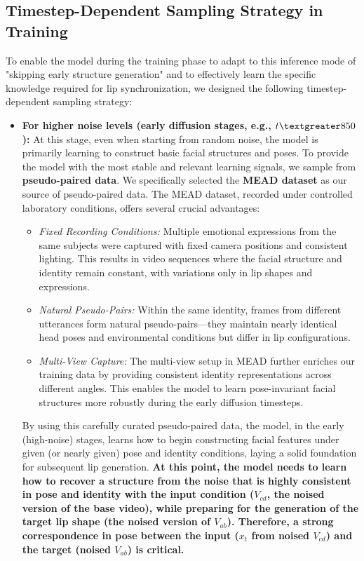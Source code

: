 \subsection*{Timestep-Dependent Sampling Strategy in Training}

To enable the model during the training phase to adapt to this inference mode of "skipping early structure generation" and to effectively learn the specific knowledge required for lip synchronization, we designed the following timestep-dependent sampling strategy:

\begin{itemize}
    \item \textbf{For higher noise levels (early diffusion stages, e.g., $t \textgreater 850$):} At this stage, even when starting from random noise, the model is primarily learning to construct basic facial structures and poses. To provide the model with the most stable and relevant learning signals, we sample from \textbf{pseudo-paired data}. We specifically selected the \textbf{MEAD dataset} as our source of pseudo-paired data. The MEAD dataset, recorded under controlled laboratory conditions, offers several crucial advantages:
    \begin{itemize}
        \item \textit{Fixed Recording Conditions:} Multiple emotional expressions from the same subjects were captured with fixed camera positions and consistent lighting. This results in video sequences where the facial structure and identity remain constant, with variations only in lip shapes and expressions.
        \item \textit{Natural Pseudo-Pairs:} Within the same identity, frames from different utterances form natural pseudo-pairs—they maintain nearly identical head poses and environmental conditions but differ in lip configurations.
        \item \textit{Multi-View Capture:} The multi-view setup in MEAD further enriches our training data by providing consistent identity representations across different angles. This enables the model to learn pose-invariant facial structures more robustly during the early diffusion timesteps.
    \end{itemize}
    By using this carefully curated pseudo-paired data, the model, in the early (high-noise) stages, learns how to begin constructing facial features under given (or nearly given) pose and identity conditions, laying a solid foundation for subsequent lip generation. \textbf{At this point, the model needs to learn how to recover a structure from the noise that is highly consistent in pose and identity with the input condition ($V_{cd}$, the noised version of the base video), while preparing for the generation of the target lip shape (the noised version of $V_{ab}$). Therefore, a strong correspondence in pose between the input ($x_t$ from noised $V_{cd}$) and the target (noised $V_{ab}$) is critical.}


\end{itemize}
